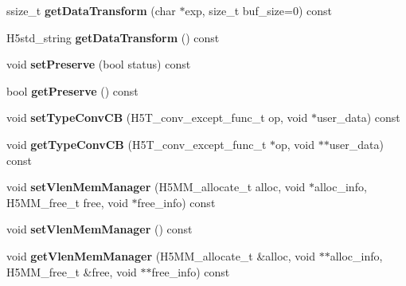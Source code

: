\begin{DoxyCompactItemize}
ssize\+\_\+t {\bfseries get\+Data\+Transform} (char $\ast$exp, size\+\_\+t buf\+\_\+size=0) const
\item 
\mbox{\label{class_h5_1_1_d_set_mem_xfer_prop_list_a2733b77b0c0f60ea705bd522585f9e8f}} 
H5std\+\_\+string {\bfseries get\+Data\+Transform} () const
\item 
\mbox{\label{class_h5_1_1_d_set_mem_xfer_prop_list_a115bf7e7037ef974eb52e6a058a0004c}} 
void {\bfseries set\+Preserve} (bool status) const
\item 
\mbox{\label{class_h5_1_1_d_set_mem_xfer_prop_list_a22672c8ba097237893f3b95f6c1dc1a6}} 
bool {\bfseries get\+Preserve} () const
\item 
\mbox{\label{class_h5_1_1_d_set_mem_xfer_prop_list_a6273b5befdd8a85c3aca06bbc02af0a0}} 
void {\bfseries set\+Type\+Conv\+CB} (H5\+T\+\_\+conv\+\_\+except\+\_\+func\+\_\+t op, void $\ast$user\+\_\+data) const
\item 
\mbox{\label{class_h5_1_1_d_set_mem_xfer_prop_list_a05390c6ff97c3430079fc847e9a9a04e}} 
void {\bfseries get\+Type\+Conv\+CB} (H5\+T\+\_\+conv\+\_\+except\+\_\+func\+\_\+t $\ast$op, void $\ast$$\ast$user\+\_\+data) const
\item 
\mbox{\label{class_h5_1_1_d_set_mem_xfer_prop_list_a3d6ed2a766e55ef0f5ebe35e14b33e0f}} 
void {\bfseries set\+Vlen\+Mem\+Manager} (H5\+M\+M\+\_\+allocate\+\_\+t alloc, void $\ast$alloc\+\_\+info, H5\+M\+M\+\_\+free\+\_\+t free, void $\ast$free\+\_\+info) const
\item 
\mbox{\label{class_h5_1_1_d_set_mem_xfer_prop_list_a3dc5c42dc7455450fb1c4c3e630f84dc}} 
void {\bfseries set\+Vlen\+Mem\+Manager} () const
\item 
\mbox{\label{class_h5_1_1_d_set_mem_xfer_prop_list_aa791fce14c84ff710461a63fc77bb54b}} 
void {\bfseries get\+Vlen\+Mem\+Manager} (H5\+M\+M\+\_\+allocate\+\_\+t \&alloc, void $\ast$$\ast$alloc\+\_\+info, H5\+M\+M\+\_\+free\+\_\+t \&free, void $\ast$$\ast$free\+\_\+info) const
$$
\end{DoxyCompactItemize}
